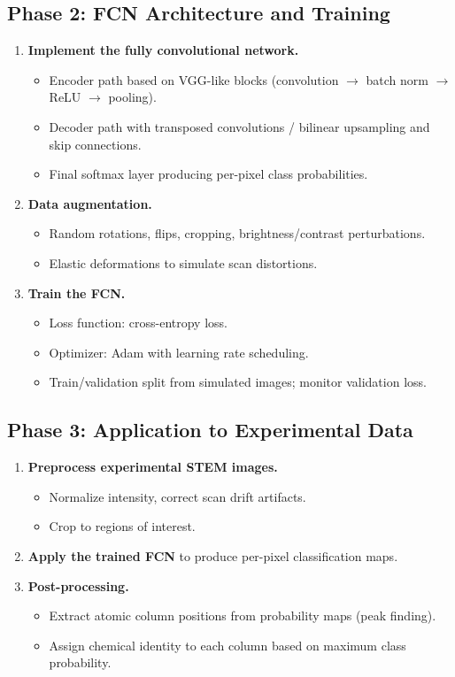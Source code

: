 \documentclass[11pt,a4paper]{article}
\begin{document}
\subsection{Phase 2: FCN Architecture and Training}
\begin{enumerate}[label=\textbf{2.\arabic*}]
  \item \textbf{Implement the fully convolutional network.}
    \begin{itemize}
      \item Encoder path based on VGG-like blocks (convolution $\to$ batch norm $\to$ ReLU $\to$ pooling).
      \item Decoder path with transposed convolutions / bilinear upsampling and skip connections.
      \item Final softmax layer producing per-pixel class probabilities.
    \end{itemize}
  \item \textbf{Data augmentation.}
    \begin{itemize}
      \item Random rotations, flips, cropping, brightness/contrast perturbations.
      \item Elastic deformations to simulate scan distortions.
    \end{itemize}
  \item \textbf{Train the FCN.}
    \begin{itemize}
      \item Loss function: cross-entropy loss.
      \item Optimizer: Adam with learning rate scheduling.
      \item Train/validation split from simulated images; monitor validation loss.
    \end{itemize}
\end{enumerate}

\subsection{Phase 3: Application to Experimental Data}
\begin{enumerate}[label=\textbf{3.\arabic*}]
  \item \textbf{Preprocess experimental STEM images.}
    \begin{itemize}
      \item Normalize intensity, correct scan drift artifacts.
      \item Crop to regions of interest.
    \end{itemize}
  \item \textbf{Apply the trained FCN} to produce per-pixel classification maps.
  \item \textbf{Post-processing.}
    \begin{itemize}
      \item Extract atomic column positions from probability maps (peak finding).
      \item Assign chemical identity to each column based on maximum class probability.
    \end{itemize}
\end{enumerate}
\end{document}
